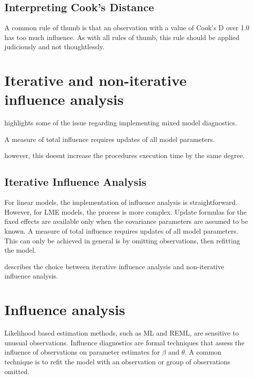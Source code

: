 \documentclass[12pt, a4paper]{article}
\begin{document}
			
			\subsection{Interpreting Cook's Distance}
			A common rule of thumb is that an observation with a value of Cook's D over 1.0 has too much influence. As with all rules of thumb, this rule should be applied judiciously and not thoughtlessly.
			
			\section{Iterative and non-iterative influence analysis} %
			\citet{schabenberger} highlights some of the issue regarding implementing mixed model diagnostics.
			
			
			A measure of total influence requires updates of all model parameters.
			
			
			however, this doesnt increase the procedures execution time by the same degree.
			\subsection{Iterative Influence Analysis}
			
			
			For linear models, the implementation of influence analysis is straightforward.
			However, for LME models, the process is more complex. Update formulas for the fixed effects are available only when the covariance parameters are assumed to be known. A measure of total influence requires updates of all model parameters.
			This can only be achieved in general is by omitting observations, then refitting the model.
			
			
			\citet{schabenberger} describes the choice between  iterative influence analysis and  non-iterative influence analysis.
			
			
			\section{Influence analysis} %
			
			
			Likelihood based estimation methods, such as ML and REML, are sensitive to unusual observations. Influence diagnostics are formal techniques that assess the influence of observations on parameter estimates for $\beta$ and $\theta$. A common technique is to refit the model with an observation or group of observations omitted.
			
\end{document}
